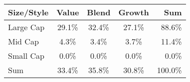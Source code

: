 \center
\begin{tabular}{l|c c c|r}
Size/Style & Value & Blend & Growth & Sum \\\hline\hline
Large Cap & 29.1\% & 32.4\% & 27.1\% & 88.6\% \\
Mid Cap & 4.3\% & 3.4\% & 3.7\% & 11.4\% \\
Small Cap & 0.0\% & 0.0\% & 0.0\% & 0.0\% \\\hline
Sum & 33.4\% & 35.8\% & 30.8\% & 100.0\% \\
\end{tabular}
